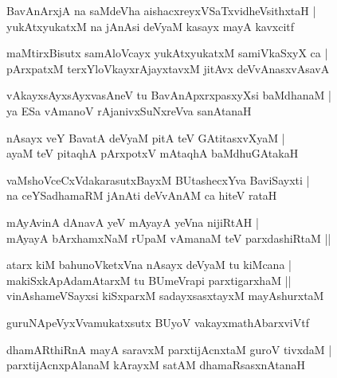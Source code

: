 \begin{shloka}
BavAnArxjA na saMdeVha aishacxreyxVSaTxvidheVsithxtaH |\\
yukAtxyukatxM na jAnAsi deVyaM kasayx mayA kavxcitf 
\end{shloka}

\begin{shloka}
maMtirxBisutx samAloVcayx yukAtxyukatxM samiVkaSxyX ca |\\
pArxpatxM terxYloVkayxrAjayxtavxM jitAvx deVvAnasxvAsavA\R
\end{shloka}

\begin{shloka}
vAkayxsAyxsAyxvasAneV tu BavAnApxrxpasxyXsi baMdhanaM |\\
ya ESa vAmanoV rAjanivxSuNxreVva sanAtanaH
\end{shloka}

\begin{shloka}
nAsayx veY BavatA deVyaM pitA teV GAtitasxvXyaM |\\
ayaM teV pitaqhA pArxpotxV mAtaqhA baMdhuGAtakaH
\end{shloka}

\begin{shloka}
vaMshoVceCxVdakarasutxBayxM BUtashecxYva BaviSayxti |\\
na ceYSadhamaRM jAnAti deVvAnAM ca hiteV rataH
\end{shloka}

\begin{shloka}
mAyAvinA dAnavA yeV mAyayA yeVna nijiRtAH |\\
mAyayA bArxhamxNaM rUpaM vAmanaM teV parxdashiRtaM ||
\end{shloka}

\begin{shloka}
atarx kiM bahunoVketxVna nAsayx deVyaM tu kiMcana |\\
makiSxkApAdamAtarxM tu BUmeVrapi parxtigarxhaM ||\\
vinAshameVSayxsi kiSxparxM sadayxsasxtayxM mayAshurxtaM
\end{shloka}

\begin{shloka}
guruNApeVyxVvamukatxsutx BUyoV vakayxmathAbarxviVtf
\end{shloka}

\begin{shloka}
dhamARthiRnA mayA saravxM parxtijAcnxtaM guroV tivxdaM |\\
parxtijAcnxpAlanaM kArayxM satAM dhamaRsasxnAtanaH
\end{shloka}

